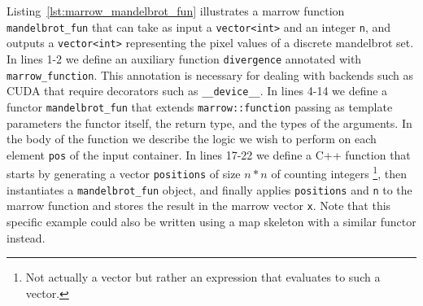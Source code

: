 Listing~\ref{lst:marrow_mandelbrot_fun} illustrates a marrow function \texttt{mandelbrot\_fun} that can take as input a \texttt{vector<int>} and an integer \texttt{n}, and outputs a \texttt{vector<int>} representing the pixel values of a discrete mandelbrot set. In lines 1-2 we define an auxiliary function \texttt{divergence} annotated with \texttt{marrow\_function}. This annotation is necessary for dealing with backends such as \gls{CUDA} that require decorators such as \texttt{\_\_device\_\_}. In lines 4-14 we define a functor \texttt{mandelbrot\_fun} that extends \texttt{marrow::function} passing as template parameters the functor itself, the return type, and the types of the arguments. In the body of the function we describe the logic we wish to perform on each element \texttt{pos} of the input container. In lines 17-22 we define a C++ function that starts by generating a vector \texttt{positions} of size $n*n$ of counting integers \footnote{Not actually a vector but rather an expression that evaluates to such a vector.}, then instantiates a \texttt{mandelbrot\_fun} object, and finally applies \texttt{positions} and \texttt{n} to the marrow function and stores the result in the marrow vector \texttt{x}. Note that this specific example could also be written using a map skeleton with a similar functor instead.





